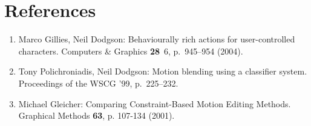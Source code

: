 \documentclass{article}
\begin{document}
\section{References}
\begin{enumerate}
  \item Marco Gillies, Neil Dodgson: Behaviourally rich actions for
        user-controlled characters. Computers \& Graphics {\bf 28}~6,
        p.~945--954 (2004).
  \item Tony Polichroniadis, Neil Dodgson: Motion blending using a classifier
        system. Proceedings of the WSCG '99, p.~225--232.
  \item Michael Gleicher: Comparing Constraint-Based Motion Editing Methods.
  	    Graphical Methods {\bf 63}, p. 107-134 (2001).
\end{enumerate}
\end{document}
